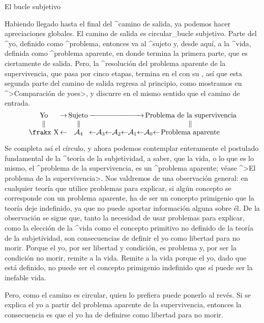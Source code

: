 \Section El bucle subjetivo

Habiendo llegado hasta el final del ^{camino de salida}, ya podemos
hacer apreciaciones globales. El camino de salida es circular_{bucle
subjetivo}. Parte del ^{yo}, definido como ^{problema}, entonces va al
^{sujeto} y, desde aquí, a la ^{vida}, definida como ^{problema
aparente}, en donde termina la primera parte, que es ciertamente de
salida. Pero, la ^{resolución} del problema aparente de la
supervivencia, que pasa por cinco etapas, termina en el {\sujeto} con su
{\yo}, así que esta segunda parte del camino de salida regresa al
principio, como mostramos en ^>Comparación de yoes>, y discurre en el
mismo sentido que el camino de entrada.
$$\vbox{\everycr={}\tabskip=0pt \lineskip=0pt
  \halign{&\hfil#\hfil\cr
   Yo& $\,\rightarrow\,$& Sujeto$\,$& \rightarrowfill& &
    $\,$Problema de la supervivencia\cr
   $\parallel$& &$\parallel$& & &$\parallel$\cr
   \frakx X& $\leftarrow$& ${\cal A}_4$& $\leftarrow$%
    ${\cal A}_3$$\leftarrow$${\cal A}_2$$\leftarrow$%
    ${\cal A}_1$$\leftarrow$& ${\cal A}_0$$\leftarrow$\hidewidth&
    Problema aparente\cr}}$$


Se completa así el círculo, y ahora podemos contemplar enteramente el
postulado fundamental de la ^{teoría de la subjetividad}, a saber, que
la vida, o lo que es lo mismo, el ^{problema de la supervivencia}, es un
^{problema aparente}; véase ^>El problema de la supervivencia>. Nos
valdremos de una observación general: en cualquier teoría que utilice
problemas para explicar, si algún concepto se corresponde con un
problema aparente, ha de ser un concepto primigenio que la teoría deje
indefinido, ya que no puede aportar información alguna sobre él. De la
observación se sigue que, tanto la necesidad de usar problemas para
explicar, como la elección de la ^{vida} como el concepto primitivo no
definido de la teoría de la subjetividad, son consecuencias de definir
el yo como libertad para no morir. Porque el yo, por ser libertad y
condición, es problema y, por ser la condición no morir, remite a la
vida. Remite a la vida porque el yo, dado que está definido, no puede
ser el concepto primigenio indefinido que sí puede ser la inefable vida.

Pero, como el camino es circular, quien lo prefiera puede ponerlo al
revés. Si se explica el yo a partir del problema aparente de la
supervivencia, entonces la consecuencia es que el yo ha de definirse
como libertad para no morir.

